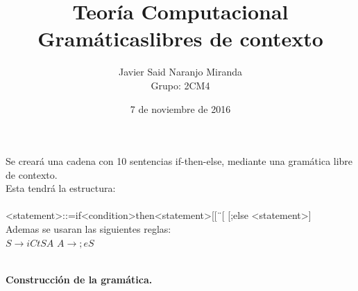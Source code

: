 \documentclass[12pt,letterpaper]{article}
\author{Javier Said Naranjo Miranda\\ Grupo: 2CM4}
\title{Teor\'ia Computacional\\ Gram\'aticaslibres de contexto}
\date{7 de noviembre de 2016}
\begin{document}
\maketitle
\justify
Se crear\'a una cadena con 10 sentencias if-then-else, mediante una gram\'atica libre de contexto.\\

Esta tendr\'a la estructura:\\ \\
<statement>::=if<condition>then<statement>[[¨[
[;else <statement>] \\

Ademas se usaran las siguientes reglas:\\
$S \rightarrow iCtSA$
$A \rightarrow ;eS$

\\

\textbf{Construcci\'on de la gram\'atica.}\\
\end{document}
